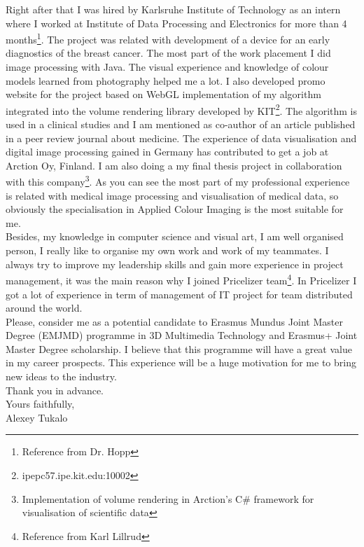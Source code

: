 \documentclass[english]{article}
\begin{document}
Right after that I was hired by Karlsruhe Institute of Technology as an intern where I worked at Institute of Data Processing and Electronics for more than 4 months\footnote{Reference from Dr. Hopp}. The project was related with development of a device for an early diagnostics of the breast cancer. The most part of the work placement I did image processing with Java. The visual experience and knowledge of colour models learned from photography helped me a lot. I also developed promo website for the project based on WebGL implementation of my algorithm integrated into the volume rendering library developed by KIT\footnote{ipepc57.ipe.kit.edu:10002}. The algorithm is used in a clinical studies and I am mentioned as co-author of an article published in a peer review journal about medicine. The experience of data visualisation and digital image processing gained in Germany has contributed to get a job at Arction Oy, Finland. I am also doing a my final thesis project in collaboration with this company\footnote{Implementation of volume rendering in Arction's C\# framework for visualisation of scientific data}. As you can see the most part of my professional experience is related with medical image processing and visualisation of medical data, so obviously the specialisation in Applied Colour Imaging is the most suitable for me.\\

Besides, my knowledge in computer science and visual art, I am well organised person, I really like to organise my own work and work of my teammates. I always try to improve my leadership skills and gain more experience in project management, it was the main reason why I joined Pricelizer team\footnote{Reference from Karl Lillrud}. In Pricelizer I got a lot of experience in term of management of IT project for team distributed around the world.\\

Please, consider me as a potential candidate to Erasmus Mundus Joint Master Degree (EMJMD) programme in 3D Multimedia Technology and Erasmus+ Joint Master Degree scholarship. I believe that this programme will have a great value in my career prospects. This experience will be a huge motivation for me to bring new ideas to the industry. \\


Thank you in advance.\\
Yours faithfully,\\
Alexey Tukalo
    
\end{document}
